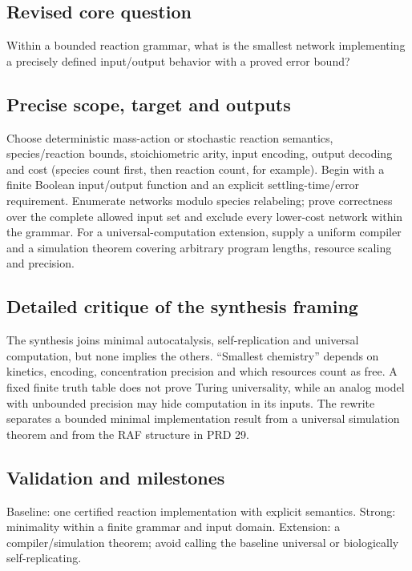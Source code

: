 \documentclass[
  11pt,
]{article}
\newcounter{none} %
\begin{document}
\subsection{Revised core question}

Within a bounded reaction grammar, what is the smallest network
implementing a precisely defined input/output behavior with a proved
error bound?

\subsection{Precise scope, target and outputs}

Choose deterministic mass-action or stochastic reaction semantics,
species/reaction bounds, stoichiometric arity, input encoding, output
decoding and cost (species count first, then reaction count, for
example). Begin with a finite Boolean input/output function and an
explicit settling-time/error requirement. Enumerate networks modulo
species relabeling; prove correctness over the complete allowed input
set and exclude every lower-cost network within the grammar. For a
universal-computation extension, supply a uniform compiler and a
simulation theorem covering arbitrary program lengths, resource scaling
and precision.

\subsection{Detailed critique of the synthesis framing}

The synthesis joins minimal autocatalysis, self-replication and
universal computation, but none implies the others. ``Smallest
chemistry'' depends on kinetics, encoding, concentration precision and
which resources count as free. A fixed finite truth table does not prove
Turing universality, while an analog model with unbounded precision may
hide computation in its inputs. The rewrite separates a bounded minimal
implementation result from a universal simulation theorem and from the
RAF structure in PRD 29.

\subsection{Validation and milestones}

Baseline: one certified reaction implementation with explicit semantics.
Strong: minimality within a finite grammar and input domain. Extension:
a compiler/simulation theorem; avoid calling the baseline universal or
biologically self-replicating.
\end{document}

